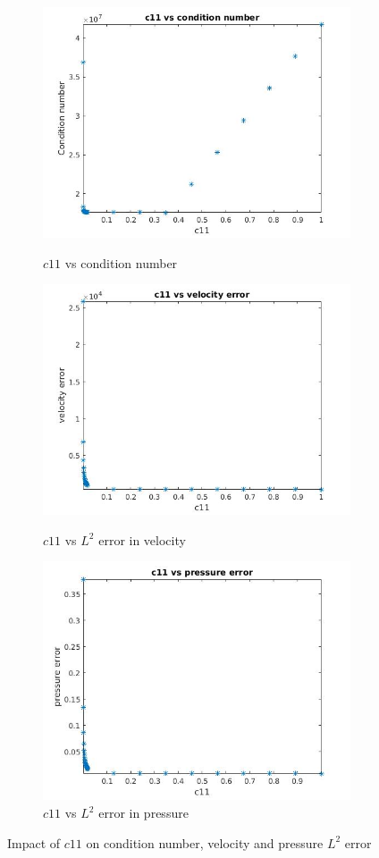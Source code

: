 \documentclass[a4paper,oneside,openright,spanish,english]{book}
\begin{document}
\begin{figure}
\begin{subfigure}{\textwidth}	
  \includegraphics[width=0.8\linewidth]{c11_condition_number.jpg}
  \caption{$c11$ vs condition number} 
  \label{$c11$ vs Condition number}
  \includegraphics[width=0.8\linewidth]{c11_velocity_l2_error.jpg}
  \caption{$c11$ vs $L^2$ error in velocity} 
  \label{c11_L2_error_velocity}
  \includegraphics[width=0.8\linewidth]{c11_pressure_l2_error.jpg}
  \caption{$c11$ vs $L^2$ error in pressure} 
  \label{c11_L2_error_pressure}
\end{subfigure}
\caption{Impact of $c11$ on condition number, velocity and pressure $L^2$ error}
\label{all_c11_figure}
\end{figure}
\end{document}

